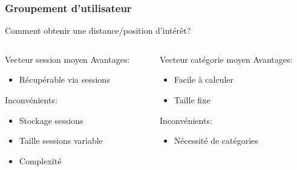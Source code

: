 \documentclass{beamer}
\begin{document}
            \begin{frame}
                \frametitle{Groupement d'utilisateur}
                Comment obtenir une distance/position d'intérêt?
                \pause
                \begin{columns}[t]
                    \begin{column}{4cm}
                        \begin{block}{Vecteur session moyen}
                            \pause
                            Avantages:
                            \begin{itemize}
                                \pause
                                \item Récupérable via sessions
                            \end{itemize}
                            \pause
                            Inconvénients:
                            \begin{itemize}
                                \pause
                                \item Stockage sessions
                                \pause
                                \item Taille sessions variable
                                \pause
                                \item Complexité
                            \end{itemize}
                        \end{block}
                    \end{column}
                    \pause
                    \begin{column}{4cm}
                        \begin{block}{Vecteur catégorie moyen}
                            \pause
                            Avantages:
                            \begin{itemize}
                                \pause
                                \item Facile à calculer
                                \pause
                                \item Taille fixe
                            \end{itemize}
                            \pause
                            Inconvénients:
                            \begin{itemize}
                                \pause
                                \item Nécessité de catégories
                            \end{itemize}
                        \end{block}
                    \end{column}
                \end{columns}
            \end{frame}
\end{document}
